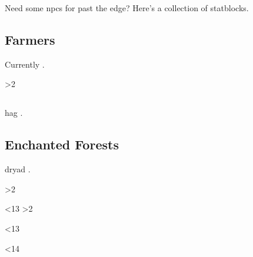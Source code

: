 \documentclass[10pt,twoside]{book}
\begin{document}
\frontmatter


\noindent
Need some \glspl{npc} for past the \gls{edge}?
Here's a collection of \glspl{statblock}.

\clearpage
\pagestyle{minizine}

\subsection{ Farmers}

Currently \seasonalActivities.

\humanfarmer

\humanfarmer

\doula

\ifnum\themp>2
  {\showStdSpells}
\fi

\clearpage

\subsection{}

\Gls{hag} .

\hag

\showStdSpells

\morphcat

\morphhuman

\morphrat

\morphrat

\morphspider

\clearpage

\subsection{Enchanted Forests}

\Gls{dryad} .

\dryad

\showStdSpells

\morphslug

\morphhuman

\elf

\ifnum\themp>2
  {\showStdSpells}
\fi

\ifnum\thepage<13
  \elf
  \ifnum\themp>2
    {\showStdSpells}
  \fi
\fi

\null

\ifnum\thepage<13
  \morphwoodspy

  \morphhorse
  \clearpage
\fi

\ifnum\thepage<14
  \clearpage\null
\fi
\end{document}
